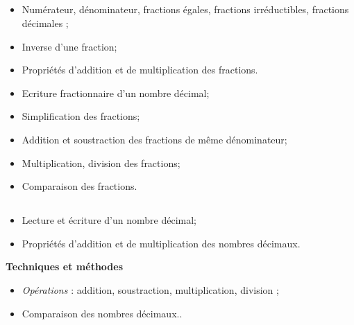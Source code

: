 \subsection*{}

\savoir
\begin{itemize}
\item Numérateur, dénominateur, fractions égales, fractions irréductibles, fractions décimales ;
\item Inverse d'une fraction;
\item Propriétés d'addition et de multiplication des fractions.
\end{itemize}
\savoirfaire
\begin{itemize}
\item Ecriture fractionnaire d'un nombre décimal;
\item Simplification des fractions;
\item Addition et soustraction des fractions de même dénominateur;
\item Multiplication, division des fractions;
\item Comparaison des fractions.
\end{itemize}

\subsection*{}

\savoir
\begin{itemize}
\item Lecture et écriture d'un nombre décimal;
\item Propriétés d'addition et de multiplication des nombres décimaux.
\end{itemize}
\savoirfaire

\textbf{Techniques et méthodes}
\begin{itemize}
\item \textit{Opérations} : addition, soustraction, multiplication, division ;
\item Comparaison des nombres décimaux..
\end{itemize}

\subsection*{}

